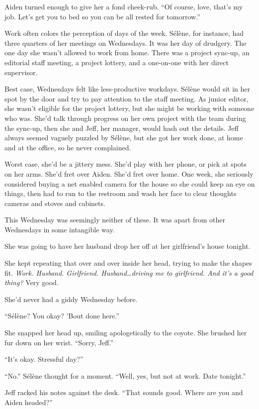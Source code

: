 Aiden turned enough to give her a fond cheek-rub. ``Of course, love, that's my job. Let's get you to bed so you can be all rested for tomorrow.''

\secdiv{}

\noindent Work often colors the perception of days of the week. Sélène, for instance, had three quarters of her meetings on Wednesdays. It was her day of drudgery. The one day she wasn't allowed to work from home. There was a project sync-up, an editorial staff meeting, a project lottery, and a one-on-one with her direct supervisor.

Best case, Wednesdays felt like less-productive workdays. Sélène would sit in her spot by the door and try to pay attention to the staff meeting. As junior editor, she wasn't eligible for the project lottery, but she might be working with someone who was. She'd talk through progress on her own project with the team during the sync-up, then she and Jeff, her manager, would hash out the details. Jeff always seemed vaguely puzzled by Sélène, but she got her work done, at home and at the office, so he never complained.

Worst case, she'd be a jittery mess. She'd play with her phone, or pick at spots on her arms. She'd fret over Aiden. She'd fret over home. One week, she seriously considered buying a net enabled camera for the house so she could keep an eye on things, then had to run to the restroom and wash her face to clear thoughts cameras and stoves and cabinets.

This Wednesday was seemingly neither of these. It was apart from other Wednesdays in some intangible way.

She was going to have her husband drop her off at her girlfriend's house tonight.

She kept repeating that over and over inside her head, trying to make the shapes fit. \emph{Work. Husband. Girlfriend. Husband\ldots{}driving me to girlfriend. And it's a good thing?} Very good.

She'd never had a giddy Wednesday before.

``Sélène? You okay? 'Bout done here.''

She snapped her head up, smiling apologetically to the coyote. She brushed her fur down on her wrist. ``Sorry, Jeff.''

``It's okay. Stressful day?''

``No.'' Sélène thought for a moment. ``Well, yes, but not at work. Date tonight.''

Jeff racked his notes against the desk. ``That sounds good. Where are you and Aiden headed?''


